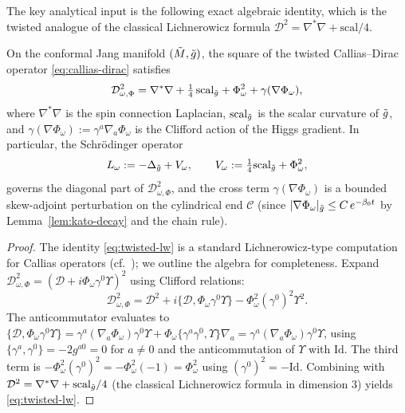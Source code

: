 The key analytical input is the following exact algebraic identity, which is the twisted analogue of the classical Lichnerowicz formula $\mathcal{D}^2 = \nabla^*\nabla + \mathrm{scal}/4$.

\begin{theorem}\label{thm:twisted-lw}
On the conformal Jang manifold $(\tilde{M},\tilde{g})$, the square of the twisted Callias--Dirac operator \eqref{eq:callias-dirac} satisfies
\begin{equation}\label{eq:twisted-lw}
\mathcal{D}_{\omega,\Phi}^2 = \nabla^*\nabla + \tfrac{1}{4}\,\mathrm{scal}_{\tilde{g}} + \Phi_\omega^2 + \gamma(\nabla\Phi_\omega),
\end{equation}
where $\nabla^*\nabla$ is the spin connection Laplacian, $\mathrm{scal}_{\tilde{g}}$ is the scalar curvature of $\tilde{g}$, and $\gamma(\nabla\Phi_\omega) := \gamma^a\nabla_a\Phi_\omega$ is the Clifford action of the Higgs gradient. In particular, the Schr\"odinger operator
\begin{equation}\label{eq:schrodinger-twist}
L_\omega := -\Delta_{\tilde{g}} + V_\omega, \qquad V_\omega := \tfrac{1}{4}\mathrm{scal}_{\tilde{g}} + \Phi_\omega^2,
\end{equation}
governs the diagonal part of $\mathcal{D}_{\omega,\Phi}^2$, and the cross term $\gamma(\nabla\Phi_\omega)$ is a bounded skew-adjoint perturbation on the cylindrical end $\mathcal{C}$ (since $|\nabla\Phi_\omega|_{\tilde{g}} \leq C\,e^{-\beta_0 t}$ by Lemma~\ref{lem:kato-decay} and the chain rule).
\end{theorem}

\begin{proof}
The identity \eqref{eq:twisted-lw} is a standard Lichnerowicz-type computation for Callias operators (cf.\ \cite{anghel1993, rade1992}); we outline the algebra for completeness. Expand $\mathcal{D}_{\omega,\Phi}^2 = (\mathcal{D} + i\Phi_\omega\gamma^0\Upsilon)^2$ using Clifford relations:
\begin{equation}
\mathcal{D}_{\omega,\Phi}^2 = \mathcal{D}^2 + i\{\mathcal{D},\Phi_\omega\gamma^0\Upsilon\} - \Phi_\omega^2(\gamma^0)^2\Upsilon^2.
\end{equation}
The anticommutator evaluates to $\{\mathcal{D},\Phi_\omega\gamma^0\Upsilon\} = \gamma^a(\nabla_a\Phi_\omega)\gamma^0\Upsilon + \Phi_\omega\{\gamma^a\gamma^0,\Upsilon\}\nabla_a = \gamma^a(\nabla_a\Phi_\omega)\gamma^0\Upsilon$, using $\{\gamma^a,\gamma^0\} = -2g^{a0} = 0$ for $a\neq 0$ and the anticommutation of $\Upsilon$ with $\mathrm{Id}$. The third term is $-\Phi_\omega^2(\gamma^0)^2 = -\Phi_\omega^2(-1) = \Phi_\omega^2$ using $(\gamma^0)^2 = -\mathrm{Id}$. Combining with $\mathcal{D}^2 = \nabla^*\nabla + \mathrm{scal}_{\tilde{g}}/4$ (the classical Lichnerowicz formula in dimension 3) yields \eqref{eq:twisted-lw}.
\end{proof}

